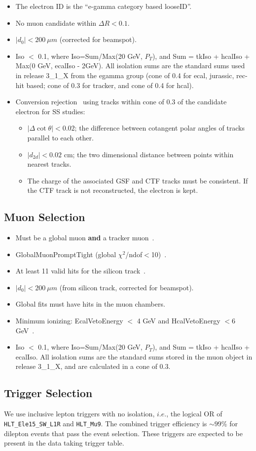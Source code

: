 \begin{itemize}
\item The electron ID is the ``e-gamma category based looseID''.
\item No muon candidate within $\Delta R < 0.1$.
\item $|d_0| < 200~\mu m$ (corrected for beamspot).
\item Iso $<$ 0.1, where Iso=Sum/Max(20 GeV, $P_T$), and Sum = tkIso + hcalIso +  Max(0 GeV, ecalIso - 2GeV).
All isolation sums are the standard sums used in release 3\_1\_X from the egamma group (cone of
0.4 for ecal, jurassic, rec-hit based; cone of 0.3 for tracker, and cone of 0.4 for hcal).
\item Conversion rejection~\cite{conversion} using tracks within cone of 0.3 of the candidate electron for SS studies: 
\begin{itemize}
\item $|\Delta \cot\theta| < 0.02$; the difference between cotangent polar angles of tracks parallel to 
each other.
\item $|d_{2d}| < 0.02$ cm; the two dimensional distance between points within nearest tracks.
\item The charge of the associated GSF and CTF tracks must be consistent.
If the CTF track is not reconstructed, the electron is kept.
\end{itemize} 
\end{itemize}

\subsection{Muon Selection}
\label{sec:muon}
\begin{itemize}
\item Must be a global muon {\bf and} a tracker muon~\cite{glbtrk}.
\item GlobalMuonPromptTight (global $\chi^2$/ndof$<$10)~\cite{muonid}.
\item At least 11 valid hits for the silicon track~\cite{muonid}.
\item $|d_0| < 200~\mu m$ (from silicon track, corrected for beamspot).
\item Global fits must have hits in the muon chambers.
\item Minimum ionizing: EcalVetoEnergy $<$ 4 GeV and HcalVetoEnergy $<6$ GeV~\cite{vplusj}. 
\item Iso $<$ 0.1, where Iso=Sum/Max(20 GeV, $P_T$), and Sum = tkIso + hcalIso +  ecalIso.
All isolation sums are the standard sums stored in the muon object in release 3\_1\_X, and
are calculated in a cone of 0.3.
\end{itemize}

\subsection{Trigger Selection}
\label{sec:trigger}
We use inclusive lepton triggers with no isolation, $i.e.$, the logical OR of {\tt HLT\_Ele15\_SW\_L1R} and {\tt HLT\_Mu9}.  
The combined trigger efficiency is $\sim 99$\% for dilepton events that pass the event selection.
These triggers are expected to be present in the data taking trigger table.
